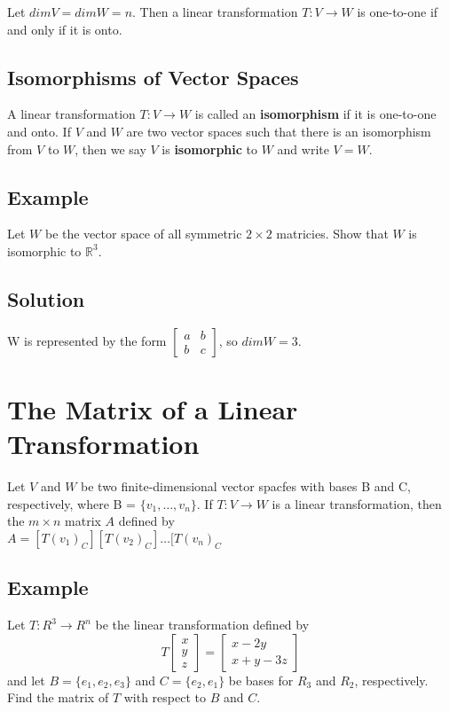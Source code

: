 Let $dim V = dim W = n$. Then a linear transformation $T:V\rightarrow W$ is one-to-one if and only if it is onto.

\subsection*{Isomorphisms of Vector Spaces}
A linear transformation $T:V\rightarrow W$ is called an \textbf{isomorphism} if it is one-to-one and onto. If $V$ and $W$ are two vector spaces such that there is an isomorphism from $V$ to $W$, then we say $V$ is \textbf{isomorphic} to $W$ and write $V = W$.
\subsection*{Example}
Let $W$ be the vector space of all symmetric $2\times 2$ matricies. Show that $W$ is isomorphic to $\mathbb{R}^3$.
\subsection*{Solution}
W is represented by the form $\begin{bmatrix}
    a&b\\b&c
\end{bmatrix}$, so $dim W = 3$.

\section*{The Matrix of a Linear Transformation}
Let $V$ and $W$ be two finite-dimensional vector spacfes with bases B and C, respectively, where B = $\{v_1, \dots, v_n\}$. 
If $T:V\rightarrow W$ is a linear transformation, then the $m\times n$ matrix $A$ defined by\\
$A = [T(v_1)_C][T(v_2)_C]\dots[T(v_n)_C$

\subsection*{Example}
Let $T: R^3 \rightarrow R^n$ be the linear transformation defined by
$$T\begin{bmatrix}
    x\\y\\z
\end{bmatrix} = \begin{bmatrix}
    x-2y\\x+y-3z
\end{bmatrix}$$ and let $B = \{e_1, e_2, e_3\}$ and $C = \{e_2, e_1\}$ be bases for $R_3$ and $R_2$, respectively. Find the matrix of $T$ with respect to $B$ and $C$.
